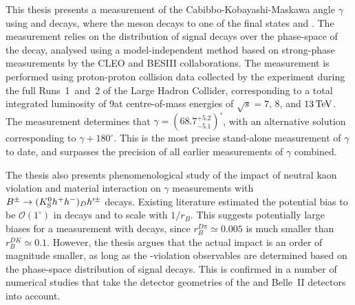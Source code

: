 This thesis presents a measurement of the Cabibbo-Kobayashi-Maskawa angle $\gamma$ using \BtoDK and \BtoDpi decays, where the \D meson decays to one of the final states \Kspipi and \KsKK.  The measurement relies on the distribution of signal decays over the phase-space of the \D decay, analysed using a model-independent method based on strong-phase measurements by the CLEO and BESIII collaborations. The measurement is performed using proton-proton collision data collected by the \lhcb experiment during the full Runs~1~and~2 of the Large Hadron Collider, corresponding to a total integrated luminosity of 9\invfb at centre-of-mass energies of $\sqrt s =7$, $8$, and $13\text{\,Te\kern -0.1em V}$. The measurement determines that $\gamma= (68.7^{+5.2}_{-5.1})^\circ$, with an alternative solution corresponding to $\gamma+180^\circ$. This is the most precise stand-alone measurement of $\gamma$ to date, and surpasses the precision of all earlier measurements of $\gamma$ combined. 

The thesis also presents phenomenological study of the impact of neutral kaon \CP violation and material interaction on $\gamma$ measurements with ${{B}^\pm}\rightarrow ({{K}^0_{\mathrm{S}}} h^+h^-)_D h'^\pm$ decays. Existing literature estimated the potential bias to be $\mathcal O(1^\circ)$ in \BtoDK decays and to scale with $1/r_B$. This suggests potentially large biases for a measurement with \BtoDpi decays, since $r_B^{D\pi}\simeq0.005$ is much smaller than $r_B^{DK}\simeq 0.1$. However, the thesis argues that the actual impact is an order of magnitude smaller, as long as the \CP-violation observables are determined based on the phase-space distribution of signal decays. This is confirmed in a number of numerical studies that take the detector geometries of the \lhcb and Belle~II detectors into account.